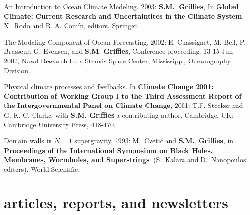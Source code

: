 \begin{etaremune}
\item An Introduction to Ocean Climate Modeling.  2003: {\bf S.M.\
Grif\/f\/ies}, In {\bf Global Climate: Current Research and
Uncertaintites in the Climate System}. X.\ Rodo and R. A. Com\'in,
editors.  Springer.

\item The Modeling Component of Ocean Forecasting, 2002:
  E. Chassignet, M. Bell, P. Brasseur, G. Evensen, and {\bf
    S.M. Grif\/f\/ies}, Conference proceeding, 13-15 Jun 2002, Naval
  Research Lab, Stennis Space Center, Mississippi, Oceanography
  Division.

\item Physical climate processes and feedbacks. In {\bf Climate Change
    2001: Contribution of Working Group I to the Third Assessment
    Report of the Intergovernmental Panel on Climate Change}, 2001:
  T.F. Stocker and G. K. C. Clarke, with {\bf S.M. Grif\/f\/ies} a
  contributing author.  Cambridge, UK: Cambridge University Press,
  418-470.

\item Domain walls in $N=1$ supergravity, 1993: M.\ Cveti\v c and {\bf
    S.M.\ Grif\/f\/ies}, in {\bf Proceedings of the International
    Symposium on Black Holes, Membranes, Wormholes, and Superstrings}.
  (S.\ Kalara and D.\ Nanopoulos editors), World Scientific.

\end{etaremune}

\section*{\sc \color{Maroon} articles, reports, and newsletters}

